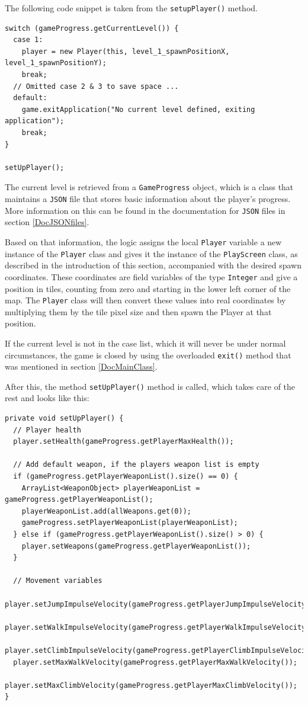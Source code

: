 \documentclass[12p]{article}
\begin{document}
The following code snippet is taken from the \texttt{setupPlayer()} method.

\begin{verbatim}
switch (gameProgress.getCurrentLevel()) {
  case 1:
    player = new Player(this, level_1_spawnPositionX, level_1_spawnPositionY);
    break;
  // Omitted case 2 & 3 to save space ...
  default:
    game.exitApplication("No current level defined, exiting application");
    break;
}

setUpPlayer();
\end{verbatim}

The current level is retrieved from a \texttt{GameProgress} object, which is a class that maintains a \texttt{JSON} file that stores basic information about the player's progress. More information on this can be found in the documentation for \texttt{JSON} files in section \ref{DocJSONfiles}.

Based on that information, the logic assigns the local \texttt{Player} variable a new instance of the \texttt{Player} class and gives it the instance of the \texttt{PlayScreen} class, as described in the introduction of this section, accompanied with the desired spawn coordinates. These coordinates are field variables of the type \texttt{Integer} and give a position in tiles, counting from zero and starting in the lower left corner of the map. The \texttt{Player} class will then convert these values into real coordinates by multiplying them by the tile pixel size and then spawn the Player at that position.

If the current level is not in the case list, which it will never be under normal circumstances, the game is closed by using the overloaded \texttt{exit()} method that was mentioned in section \ref{DocMainClass}.

After this, the method \texttt{setUpPlayer()} method is called, which takes care of the rest and looks like this:

\begin{verbatim}
private void setUpPlayer() {
  // Player health
  player.setHealth(gameProgress.getPlayerMaxHealth());

  // Add default weapon, if the players weapon list is empty
  if (gameProgress.getPlayerWeaponList().size() == 0) {
    ArrayList<WeaponObject> playerWeaponList = gameProgress.getPlayerWeaponList();
    playerWeaponList.add(allWeapons.get(0));
    gameProgress.setPlayerWeaponList(playerWeaponList);
  } else if (gameProgress.getPlayerWeaponList().size() > 0) {
    player.setWeapons(gameProgress.getPlayerWeaponList());
  }

  // Movement variables
  player.setJumpImpulseVelocity(gameProgress.getPlayerJumpImpulseVelocity());
  player.setWalkImpulseVelocity(gameProgress.getPlayerWalkImpulseVelocity());
  player.setClimbImpulseVelocity(gameProgress.getPlayerClimbImpulseVelocity());
  player.setMaxWalkVelocity(gameProgress.getPlayerMaxWalkVelocity());
  player.setMaxClimbVelocity(gameProgress.getPlayerMaxClimbVelocity());
}
\end{verbatim}
\end{document}
